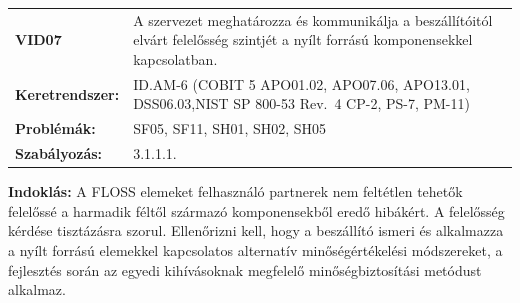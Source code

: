 \documentclass[12pt,magyar,a4paper,oneside]{scrreprt}
\begin{document}
\begin{longtable}[]{@{}ll@{}}
\toprule
\endhead
\begin{minipage}[t]{0.16\columnwidth}\raggedright
\textbf{VID07}\strut
\end{minipage} & \begin{minipage}[t]{0.79\columnwidth}\raggedright
A szervezet meghatározza és kommunikálja a beszállítóitól elvárt
felelősség szintjét a nyílt forrású komponensekkel kapcsolatban.\strut
\end{minipage}\tabularnewline
\begin{minipage}[t]{0.16\columnwidth}\raggedright
\textbf{Keretrendszer:}\strut
\end{minipage} & \begin{minipage}[t]{0.79\columnwidth}\raggedright
ID.AM-6 (COBIT 5 APO01.02, APO07.06, APO13.01, DSS06.03,NIST SP 800-53
Rev.~4 CP-2, PS-7, PM-11)\strut
\end{minipage}\tabularnewline
\begin{minipage}[t]{0.16\columnwidth}\raggedright
\textbf{Problémák:}\strut
\end{minipage} & \begin{minipage}[t]{0.79\columnwidth}\raggedright
SF05, SF11, SH01, SH02, SH05\strut
\end{minipage}\tabularnewline
\begin{minipage}[t]{0.16\columnwidth}\raggedright
\textbf{Szabályozás:}\strut
\end{minipage} & \begin{minipage}[t]{0.79\columnwidth}\raggedright
3.1.1.1.\strut
\end{minipage}\tabularnewline
\bottomrule
\end{longtable}

\textbf{Indoklás: } A FLOSS elemeket felhasználó partnerek nem feltétlen
tehetők felelőssé a harmadik féltől származó komponensekből eredő
hibákért. A felelősség kérdése tisztázásra szorul. Ellenőrizni kell,
hogy a beszállító ismeri és alkalmazza a nyílt forrású elemekkel
kapcsolatos alternatív minőségértékelési módszereket, a fejlesztés során
az egyedi kihívásoknak megfelelő minőségbiztosítási metódust alkalmaz.
\end{document}
